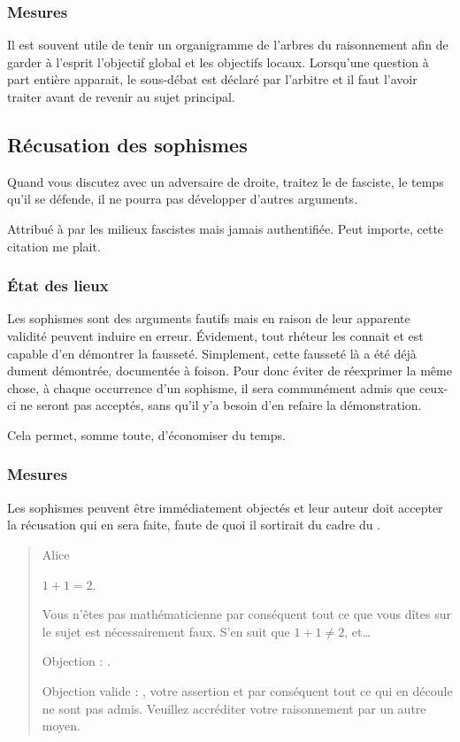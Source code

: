 \subsubsection{Mesures}
Il est souvent utile de tenir un organigramme de l’arbres du raisonnement afin de garder à l’esprit l’objectif global et les objectifs locaux. Lorsqu’une question à part entière apparait, le sous-débat est déclaré par l’arbitre et il faut l’avoir traiter avant de revenir au sujet principal.

\subsection{Récusation des sophismes}
\epigraph{Quand vous discutez avec un adversaire de droite, traitez le de fasciste, le temps qu’il se défende, il ne pourra pas développer d’autres arguments.}{Attribué à  par les milieux fascistes mais jamais authentifiée. Peut importe, cette citation me plait.}
\subsubsection{État des lieux}
Les sophismes sont des arguments fautifs mais en raison de leur apparente validité peuvent induire en erreur. Évidement, tout rhéteur les connait et est capable d’en démontrer la fausseté. Simplement, cette fausseté là a été déjà dument démontrée, documentée à foison. Pour donc éviter de réexprimer la même chose, à chaque occurrence d’un sophisme, il sera communément admis que ceux-ci ne seront pas acceptés, sans qu’il y’a besoin d’en refaire la démonstration.

Cela permet, somme toute, d’économiser du temps.

\subsubsection{Mesures}
Les sophismes peuvent être immédiatement objectés et leur auteur doit accepter la récusation qui en sera faite, faute de quoi il sortirait du cadre du \mainabbr{}.
\begin{quote}
  \begin{drama}{0cm}{0cm}{Alice}

    \Aspeaks       $1+1=2$.

    \Bspeaks       Vous n’êtes pas mathématicienne par conséquent tout ce que vous dîtes sur le sujet est nécessairement faux. S’en suit que $1+1\neq2$, et…

    \Aspeaks       Objection : .

    \Arbitrespeaks Objection valide : \B, votre assertion et par conséquent tout ce qui en découle ne sont pas admis. Veuillez accréditer votre raisonnement par un autre moyen.

  \end{drama}
\end{quote}

